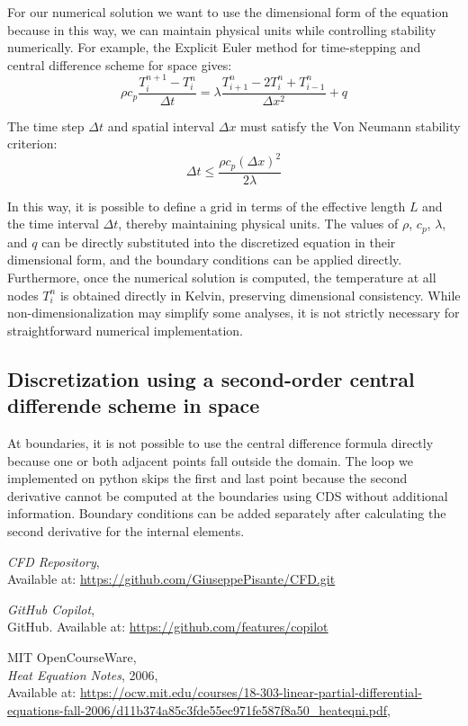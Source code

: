 \documentclass{article}
\begin{document}
For our numerical solution we want to use the dimensional form of the equation because in this way, we can maintain physical units while 
controlling stability numerically. For example, the Explicit Euler method for time-stepping and central difference scheme for space gives:
\[
\rho c_p \frac{T_i^{n+1} - T_i^n}{\Delta t} = \lambda \frac{T_{i+1}^n - 2T_i^n + T_{i-1}^n}{\Delta x^2} + q
\]

The time step $\Delta t$ and spatial interval $\Delta x$ must satisfy the Von Neumann stability criterion:
\[
\Delta t \leq \frac{\rho c_p (\Delta x)^2}{2 \lambda}
\]

In this way, it is possible to define a grid in terms of the effective length $L$ and the time interval $\Delta t$, 
thereby maintaining physical units. The values of $\rho$, $c_p$, $\lambda$, and $q$ can be directly substituted into 
the discretized equation in their dimensional form, and the boundary conditions can be applied directly. Furthermore,
once the numerical solution is computed, the temperature at all nodes $T_i^n$ is obtained directly in Kelvin, preserving
dimensional consistency. While non-dimensionalization may simplify some analyses, it is not strictly necessary for straightforward 
numerical implementation.

\subsection{Discretization using a second-order central differende scheme in space}

At boundaries, it is not possible to use the central difference formula directly because one or both adjacent points fall outside the domain.
The loop we implemented on python skips the first and last point because the second derivative cannot be computed at the boundaries using CDS
without additional information. Boundary conditions can be added separately after calculating the second derivative for the internal elements.


\begin{thebibliography}{9}
  \textit{CFD Repository},\\
  Available at: \url{https://github.com/GiuseppePisante/CFD.git}
  
  \textit{GitHub Copilot},\\
  GitHub. Available at: \url{https://github.com/features/copilot}
  
  MIT OpenCourseWare,\\
  \textit{Heat Equation Notes}, 2006,\\
  Available at: \url{https://ocw.mit.edu/courses/18-303-linear-partial-differential-equations-fall-2006/d11b374a85c3fde55ec971fe587f8a50_heateqni.pdf},\\
\end{thebibliography}
\end{document}
